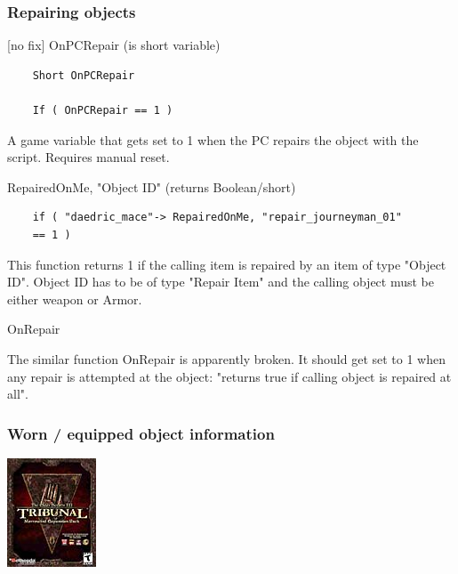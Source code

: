 \hypertarget{section-1}{%
\subsubsection{}\label{section-1}}

\hypertarget{repairing-objects}{%
\subsubsection{Repairing objects}\label{repairing-objects}}

	{[}no fix{]} OnPCRepair (is short variable)

\begin{lstlisting}	
	Short OnPCRepair
	
	If ( OnPCRepair == 1 )
\end{lstlisting}

A game variable that gets set to 1 when the PC repairs the object with
the script. Requires manual reset.

	RepairedOnMe, "Object ID" (returns Boolean/short)

\begin{lstlisting}	
	if ( "daedric_mace"-> RepairedOnMe, "repair_journeyman_01"
	== 1 )
\end{lstlisting}

This function returns 1 if the calling item is repaired by an item of
type "Object ID". Object ID has to be of type "Repair Item" and the
calling object must be either weapon or Armor.

OnRepair

The similar function OnRepair is apparently broken. It should get set to
1 when any repair is attempted at the object: "returns true if calling
object is repaired at all".

\hypertarget{worn-equipped-object-information}{%
\subsubsection{Worn / equipped object
information}\label{worn-equipped-object-information}}

\includegraphics{media/image6.png}

